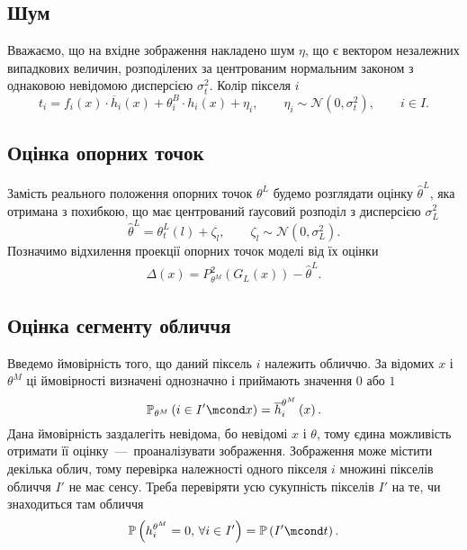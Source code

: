 \subsection{Шум}

Вважаємо,
що на вхідне зображення накладено шум $\eta$,
що є вектором незалежних випадкових величин,
розподілених за центрованим нормальним законом
з однаковою невідомою дисперсією $\sigma_t^2$.
Колір пікселя $i$
\begin{equation*}
  t_i = f_i\left( x \right) \cdot \overline{h}_i\left( x \right)
    + \theta_i^B \cdot h_i\left( x \right) + \eta_i,\qquad
  \eta_i \sim \mathcal{N}\left( 0, \sigma^2_t\right), \qquad
  i \in I.
\end{equation*}

\subsection{Оцінка опорних точок}

Замість реального положення опорних точок $\theta^L$
будемо розглядати оцінку $\hat{\theta}^L$,
яка отримана з похибкою,
що має центрований ґаусовий розподіл
з дисперсією $\sigma^2_L$
\begin{equation*}
  \hat{\theta}^L = \theta_t^L\left( l \right) + \zeta_l,
  \qquad \zeta_l \sim \mathcal{N}\left( 0, \sigma_L^2 \right).
\end{equation*}
Позначимо відхилення проекції опорних точок моделі
від їх оцінки
\begin{align*}
  \Delta\left( x \right)
  = P^2_{\theta^M}\left( G_L\left( x \right) \right) - \hat{\theta}^L.
\end{align*}

\subsection{Оцінка сегменту обличчя}

Введемо ймовірність того, що даний піксель $i$ належить обличчю.
За відомих $x$ і $\theta^M$ ці ймовірності визначені однозначно
і приймають значення $0$ або $1$
\begin{equation*}
  \mathbb{P}_{\theta^M}\left( i \in I' \mcond x \right)
  = \overline{h}_i^{\theta^M}\left( x \right).
\end{equation*}
Дана ймовірність заздалегіть невідома, бо невідомі $x$ і $\theta$,
тому єдина можливість отримати її оцінку~---~проаналізувати зображення.
Зображення може містити декілька облич,
тому перевірка належності одного пікселя $i$ множині пікселів обличчя $I'$
не має сенсу.
Треба перевіряти усю сукупність пікселів $I'$ на те,
чи знаходиться там обличчя
\begin{equation*}
  \mathbb{P}\left( h_i^{\theta^M} = 0, \, \forall i \in I' \right)
  = \mathbb{P}\left( I' \mcond t \right).
\end{equation*}

